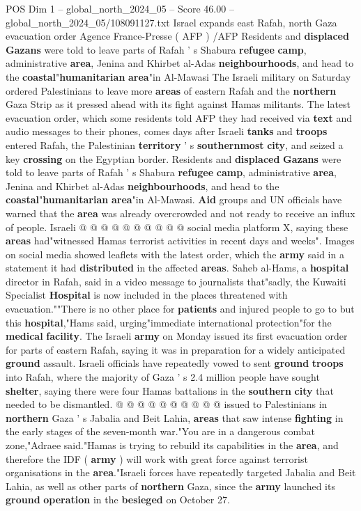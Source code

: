 \begin{textsample}{POS Dim 1 – global\_north\_2024\_05 – Score 46.00 – global\_north\_2024\_05/108091127.txt}  \label{ex:f1_pos_272}
Israel expands east Rafah, north Gaza evacuation order Agence France-Presse ( AFP ) /AFP Residents and \textbf{displaced} \textbf{Gazans} were told to leave parts of Rafah ' s Shabura \textbf{refugee} \textbf{camp}, administrative \textbf{area}, Jenina and Khirbet al-Adas \textbf{neighbourhoods}, and head to the \textbf{coastal}"\textbf{humanitarian} \textbf{area}"in Al-Mawasi The Israeli military on Saturday ordered Palestinians to leave more \textbf{areas} of eastern Rafah and the \textbf{northern} Gaza Strip as it pressed ahead with its fight against Hamas militants.
The latest evacuation order, which some residents told AFP they had received via \textbf{text} and audio messages to their phones, comes days after Israeli \textbf{tanks} and \textbf{troops} entered Rafah, the Palestinian \textbf{territory} ' s \textbf{southernmost} \textbf{city}, and seized a key \textbf{crossing} on the Egyptian border.
Residents and \textbf{displaced} \textbf{Gazans} were told to leave parts of Rafah ' s Shabura \textbf{refugee} \textbf{camp}, administrative \textbf{area}, Jenina and Khirbet al-Adas \textbf{neighbourhoods}, and head to the \textbf{coastal}"\textbf{humanitarian} \textbf{area}"in Al-Mawasi. \textbf{Aid} groups and UN officials have warned that the \textbf{area} was already overcrowded and not ready to receive an influx of people.
Israeli @ @ @ @ @ @ @ @ @ @ social media platform X, saying these \textbf{areas} had"witnessed Hamas terrorist activities in recent days and weeks".
Images on social media showed leaflets with the latest order, which the \textbf{army} said in a statement it had \textbf{distributed} in the affected \textbf{areas}.
Saheb al-Hams, a \textbf{hospital} director in Rafah, said in a video message to journalists that"sadly, the Kuwaiti Specialist \textbf{Hospital} is now included in the places threatened with evacuation.""There is no other place for \textbf{patients} and injured people to go to but this \textbf{hospital},"Hams said, urging"immediate international protection"for the \textbf{medical} \textbf{facility}.
The Israeli \textbf{army} on Monday issued its first evacuation order for parts of eastern Rafah, saying it was in preparation for a widely anticipated \textbf{ground} assault.
Israeli officials have repeatedly vowed to sent \textbf{ground} \textbf{troops} into Rafah, where the majority of Gaza ' s 2.4 million people have sought \textbf{shelter}, saying there were four Hamas battalions in the \textbf{southern} \textbf{city} that needed to be dismantled. @ @ @ @ @ @ @ @ @ @ issued to Palestinians in \textbf{northern} Gaza ' s Jabalia and Beit Lahia, \textbf{areas} that saw intense \textbf{fighting} in the early stages of the seven-month war."You are in a dangerous combat zone,"Adraee said."Hamas is trying to rebuild its capabilities in the \textbf{area}, and therefore the IDF ( \textbf{army} ) will work with great force against terrorist organisations in the \textbf{area}."Israeli forces have repeatedly targeted Jabalia and Beit Lahia, as well as other parts of \textbf{northern} Gaza, since the \textbf{army} launched its \textbf{ground} \textbf{operation} in the \textbf{besieged} on October 27.

\end{textsample}
